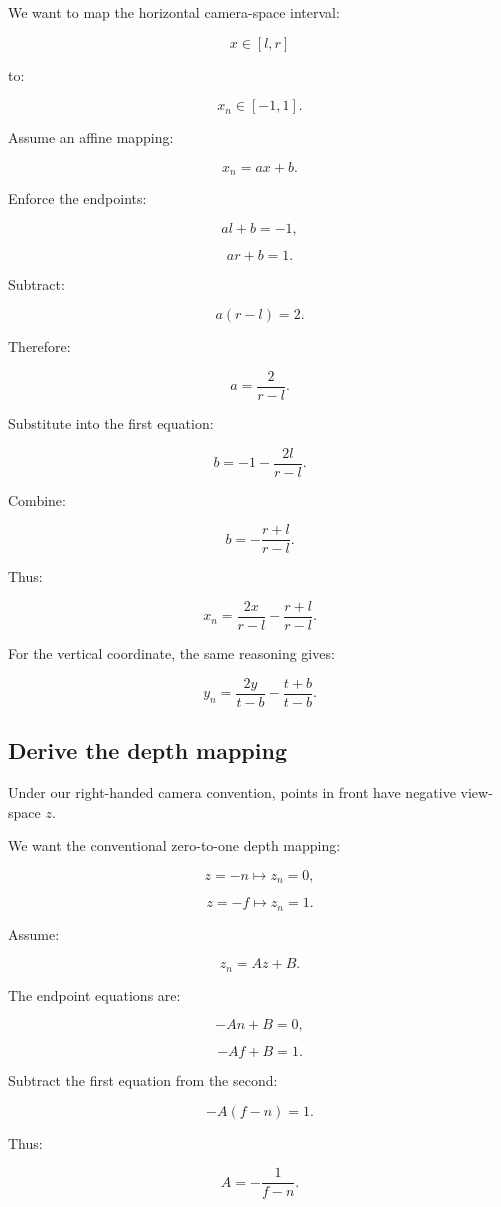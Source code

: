 We want to map the horizontal camera-space interval:

\[
 x\in[l,r]
\]

to:

\[
 x_n\in[-1,1].
\]

Assume an affine mapping:

\[
 x_n=ax+b.
\]

Enforce the endpoints:

\[
 al+b=-1,
\]

\[
 ar+b=1.
\]

Subtract:

\[
 a(r-l)=2.
\]

Therefore:

\[
 \boxed{ a=\frac2{r-l} }.
\]

Substitute into the first equation:

\[
 b=-1-\frac{2l}{r-l}.
\]

Combine:

\[
 \boxed{ b=-\frac{r+l}{r-l} }.
\]

Thus:

\[
 \boxed{ x_n= \frac{2x}{r-l} -\frac{r+l}{r-l} }.
\]

For the vertical coordinate, the same reasoning gives:

\[
 \boxed{ y_n= \frac{2y}{t-b} -\frac{t+b}{t-b} }.
\]

\subsection{Derive the depth mapping}\label{02-foundations-ii-ch033-derive-the-depth-mapping}

Under our right-handed camera convention, points in front have negative view-space \(z\).

We want the conventional zero-to-one depth mapping:

\[
 z=-n\longmapsto z_n=0,
\]

\[
 z=-f\longmapsto z_n=1.
\]

Assume:

\[
 z_n=Az+B.
\]

The endpoint equations are:

\[
 -An+B=0,
\]

\[
 -Af+B=1.
\]

Subtract the first equation from the second:

\[
 -A(f-n)=1.
\]

Thus:

\[
 \boxed{ A=-\frac1{f-n} }.
\]

